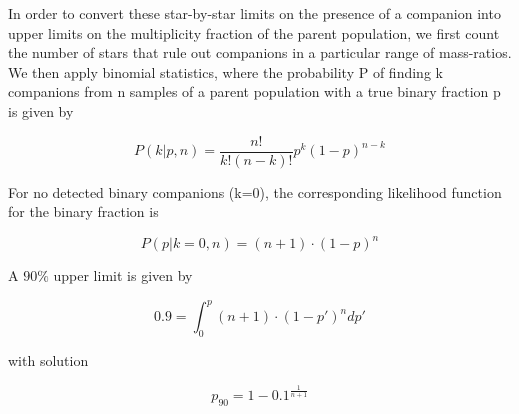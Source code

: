 In order to convert these star-by-star limits on the presence of a
companion into upper limits on the multiplicity
fraction of the parent population, we first count the number of stars
that rule out companions in a particular range of mass-ratios. We then
apply binomial statistics, where the probability P of finding k
companions from n samples of a parent population with a true binary
fraction p is given by

\begin{equation}
P(k|p,n) = \frac{n!}{k!(n-k)!}p^k(1-p)^{n-k}
\label{paper1_eqn:binomial}
\end{equation}

For no detected binary companions (k=0), the corresponding likelihood
function for the binary fraction is

\begin{equation}
P(p|k=0, n) = (n+1)\cdot  (1-p)^n
\label{paper1_eqn:likelihood}
\end{equation}

A $90\%$ upper limit is given by

\begin{equation}
0.9 = \int_0^p (n+1)\cdot  (1-p')^n dp'
\label{paper1_eqn:limitdef}
\end{equation}

with solution

\begin{equation}
p_{90} = 1 - 0.1^{\frac{1}{n+1}}
\label{paper1_eqn:limit}
\end{equation}

